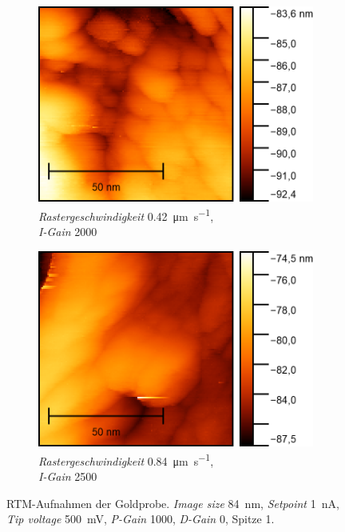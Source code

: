 \begin{figure}[H]
    \centering
    \begin{subfigure}{0.45\textwidth}
        \centering
        \includegraphics[width=\linewidth]{../figs/Gold10453}
        \caption{\textit{Rastergeschwindigkeit} \SI{0,42}{\micro\meter \per \second},\\ \textit{I-Gain} \num{2000}}
    \end{subfigure}
    \begin{subfigure}{0.45\textwidth}
        \centering
        \includegraphics[width=\linewidth]{../figs/Gold10460}
        \caption{\textit{Rastergeschwindigkeit} \SI{0,84}{\micro\meter \per \second},\\ \textit{I-Gain} \num{2500}}
    \end{subfigure}
    \caption{RTM-Aufnahmen der Goldprobe. \textit{Image size} \SI{84}{\nano \meter}, \textit{Setpoint} \SI{1}{\nano \ampere},
    \textit{Tip voltage} \SI{500}{\milli \volt}, \textit{P-Gain} \num{1000}, \textit{D-Gain} \num{0}, Spitze 1.}\label{fig:gold2}
\end{figure}
